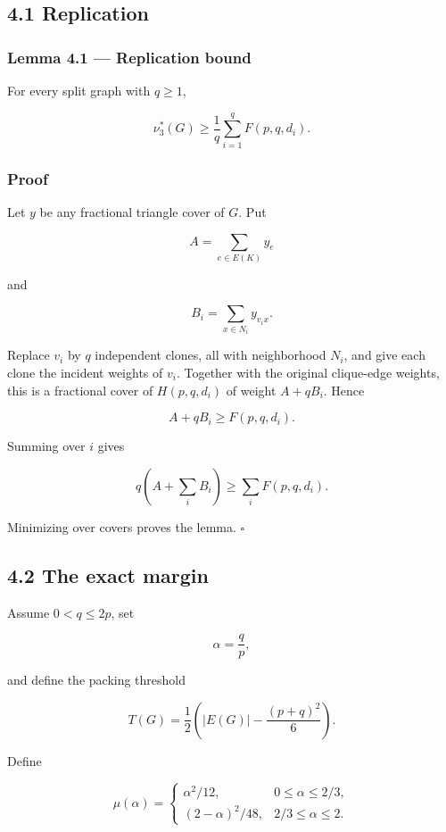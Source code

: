 \documentclass[11pt,a4paper]{article}
\begin{document}
\subsection{4.1 Replication}\label{replication}

\subsubsection{Lemma 4.1 --- Replication bound}\label{lemma-4.1-replication-bound}

For every split graph with \(q\ge1\),

\[
\boxed{
\nu_3^*(G)
\ge
\frac1q\sum_{i=1}^qF(p,q,d_i).
}
\tag{4.1}
\]

\subsubsection{Proof}\label{proof-1}

Let \(y\) be any fractional triangle cover of \(G\). Put

\[
A=\sum_{e\in E(K)}y_e
\]

and

\[
B_i=\sum_{x\in N_i}y_{v_ix}.
\]

Replace \(v_i\) by \(q\) independent clones, all with neighborhood \(N_i\), and give each clone the incident weights of \(v_i\). Together with the original clique-edge weights, this is a fractional cover of \(H(p,q,d_i)\) of weight \(A+qB_i\). Hence

\[
A+qB_i\ge F(p,q,d_i).
\]

Summing over \(i\) gives

\[
q\left(A+\sum_iB_i\right)
\ge
\sum_iF(p,q,d_i).
\]

Minimizing over covers proves the lemma. \(\square\)

\subsection{4.2 The exact margin}\label{the-exact-margin}

Assume \(0<q\le2p\), set

\[
\alpha=\frac qp,
\]

and define the packing threshold

\[
T(G)=\frac12\left(|E(G)|-\frac{(p+q)^2}{6}\right).
\tag{4.2}
\]

Define

\[
\mu(\alpha)
=
\begin{cases}
\alpha^2/12,&0\le\alpha\le2/3,\\
(2-\alpha)^2/48,&2/3\le\alpha\le2.
\end{cases}
\tag{4.3}
\]
\end{document}
